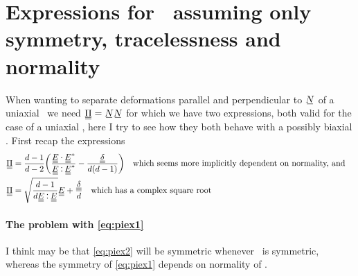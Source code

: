 \documentclass[11pt]{article}
\begin{document}
\section{Expressions for \PP\ assuming only symmetry, tracelessness and normality}
When wanting to separate deformations parallel and perpendicular to $\su{N}$ of a uniaxial \EE\ we need $\du{\Pi} = \su{N}\su{N}$ for which we have two expressions, both valid for the case of a uniaxial \PP, here I try to see how they both behave with a possibly biaxial \EE.
First recap the expressions
\begin{align}
    \du{\Pi} & = \frac{d-1}{d-2}\qty(\frac{\du{E} \cdot \du{E}^*}{\du{E} \cddot \du{E}^*} - \frac{\du{\delta}}{d(d-1)}) \qq{which seems more implicitly dependent on normality, and} \label{eq:piex1}\\
    \du{\Pi} & = \sqrt{\frac{d-1}{d \du{E} \cddot \du{E}}} \du{E} + \frac{\du{\delta}}{d} \label{eq:piex2} \qq{which has a complex square root}
\end{align}

\paragraph{The problem with \cref{eq:piex1}} I think may be that \cref{eq:piex2} will be symmetric whenever \EE\ is symmetric, whereas the symmetry of \cref{eq:piex1} depends on normality of \EE.
\end{document}
